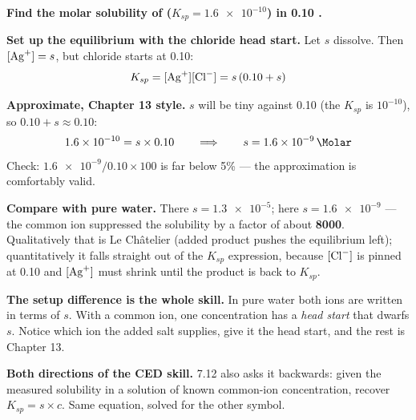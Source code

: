 \documentclass{apchem-worksheet}
\begin{document}
\begin{workedexample}
\textbf{Find the molar solubility of 
($K_{sp} = \num{1.6e-10}$) in \SI{0.10}{\Molar} .}

\textbf{Set up the equilibrium with the chloride head start.} Let $s$
dissolve. Then $[\ce{Ag+}] = s$, but chloride starts at 0.10:
\[ K_{sp} = [\ce{Ag+}][\ce{Cl-}] = s\,(0.10 + s) \]

\textbf{Approximate, Chapter 13 style.} $s$ will be tiny against 0.10
(the $K_{sp}$ is $10^{-10}$), so $0.10 + s \approx 0.10$:
\[ \num{1.6e-10} = s \times 0.10
   \qquad\Longrightarrow\qquad
   s = \mathbf{\SI{1.6e-9}{\Molar}} \]
Check: $\num{1.6e-9}/0.10 \times 100$ is far below 5\% --- the
approximation is comfortably valid.

\textbf{Compare with pure water.} There $s = \num{1.3e-5}$; here
$s = \num{1.6e-9}$ --- the common ion suppressed the solubility by a
factor of about \textbf{8000}. Qualitatively that is Le Ch\^{a}telier
(added product pushes the equilibrium left); quantitatively it falls
straight out of the $K_{sp}$ expression, because $[\ce{Cl-}]$ is pinned
at 0.10 and $[\ce{Ag+}]$ must shrink until the product is back to
$K_{sp}$.

\textbf{The setup difference is the whole skill.} In pure water both
ions are written in terms of $s$. With a common ion, one concentration
has a \emph{head start} that dwarfs $s$. Notice which ion the added
salt supplies, give it the head start, and the rest is Chapter 13.

\textbf{Both directions of the CED skill.} 7.12 also asks it backwards:
given the measured solubility in a solution of known common-ion
concentration, recover $K_{sp} = s \times c$. Same equation, solved for
the other symbol.
\end{workedexample}
\end{document}
